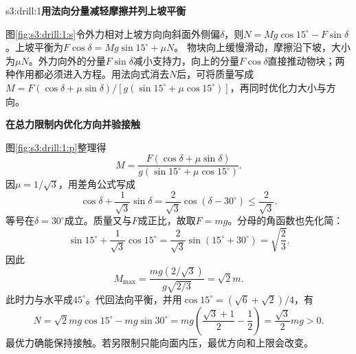 \LectureAnswerSection

\begin{drillsolution}{s3:drill:1}\textbf{用法向分量减轻摩擦并列上坡平衡}\par\nobreak
图\ref{fig:s3:drill:1:s}令外力相对上坡方向向斜面外侧偏$\delta$，则$N=Mg\cos15^\circ-F\sin\delta$。上坡平衡为$F\cos\delta=Mg\sin15^\circ+\mu N$。
物块向上缓慢滑动，摩擦沿下坡，大小为$\mu N$。外力向外的分量$F\sin\delta$减小支持力，向上的分量$F\cos\delta$直接推动物块；两种作用都必须进入方程。用法向式消去$N$后，可将质量写成$M=F(\cos\delta+\mu\sin\delta)/[g(\sin15^\circ+\mu\cos15^\circ)]$，再同时优化力大小与方向。



\par\medskip{}\noindent\textbf{在总力限制内优化方向并验接触}\par\nobreak
图\ref{fig:s3:drill:1:p}整理得
\[
M=\frac{F(\cos\delta+\mu\sin\delta)}{g(\sin15^\circ+\mu\cos15^\circ)}.
\]
因$\mu=1/\sqrt3$，用差角公式写成
\[
\cos\delta+\frac1{\sqrt3}\sin\delta
=\frac2{\sqrt3}\cos(\delta-30^\circ)
\le\frac2{\sqrt3}.
\]
等号在$\delta=30^\circ$成立。质量又与$F$成正比，故取$F=mg$。分母的角函数也先化简：
\[
\sin15^\circ+\frac1{\sqrt3}\cos15^\circ
=\frac2{\sqrt3}\sin(15^\circ+30^\circ)
=\sqrt{\frac23}.
\]
因此
\[
M_{\max}=\frac{mg(2/\sqrt3)}{g\sqrt{2/3}}=\sqrt2m.
\]
此时力与水平成$45^\circ$。代回法向平衡，并用$\cos15^\circ=(\sqrt6+\sqrt2)/4$，有
\[
N=\sqrt2mg\cos15^\circ-mg\sin30^\circ
=mg\left(\frac{\sqrt3+1}{2}-\frac12\right)
=\frac{\sqrt3}{2}mg>0.
\]
最优力确能保持接触。若另限制只能向面内压，最优方向和上限会改变。\end{drillsolution}
